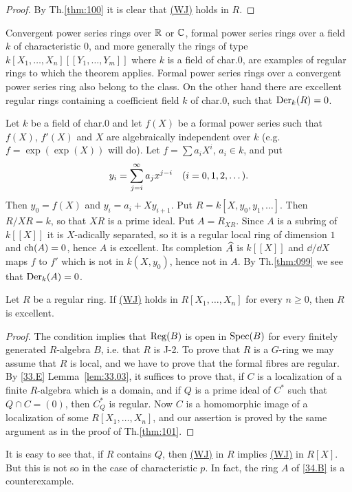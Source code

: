 \documentclass[../main]{subfiles}
\begin{document}
\begin{proof}
By Th.\ref{thm:100} it is clear that \hyperref[40.F]{(WJ)} holds in $R$. 
\end{proof}

\begin{remark*}
Convergent power series rings over $\mathbb{R}$ or $\mathbb{C}$, formal power series rings over a field $k$ of characteristic $0$, and more generally the rings of type \newline $k[X_1, \ldots, X_n][[Y_1, \ldots, Y_m]]$ where $k$ is a field of char.$0$, are examples of regular rings to which the theorem applies. Formal power series rings over a convergent power series ring also belong to the class. On the other hand there are excellent regular rings containing a coefficient field $k$ of char.$0$, such that $\operatorname{Der}_k(R) = 0$.
\end{remark*}

\begin{example}
Let $k$ be a field of char.$0$ and let $f(X)$ be a formal power series such that $f(X)$, $f'(X)$ and $X$ are algebraically independent over $k$ (e.g.\newline $f = \exp(\exp(X))$ will do). Let $f = \sum a_i X^i$, $a_i \in k$, and put \[y_i = \sum_{j = i}^\infty a_j x^{j - i}\for{i = 0, 1, 2, \ldots}.\] Then $y_0 = f(X)$ and $y_i = a_i + X y_{i + 1}$. Put $R = k[X, y_0, y_1, \ldots]$. Then $R/XR = k$, so that $XR$ is a prime ideal. Put $A = R_{XR}$. Since $A$ is a subring of $k[[X]]$ it is $X$-adically separated, so it is a regular local ring of dimension $1$ and $\operatorname{ch}(A) = 0$, hence $A$ is excellent. Its completion $\widehat{A}$ is $k[[X]]$ and $\dd/\dd X$ maps $f$ to $f'$ which is not in $k(X, y_0)$, hence not in $A$. By Th.\ref{thm:099} we see that $\operatorname{Der}_k(A) = 0$. 
\end{example}

\begin{theorem}\label{thm:103}
Let $R$ be a regular ring. If \hyperref[40.F]{(WJ)} holds in $R[X_1, \ldots, X_n]$ for every $n \ge 0$, then $R$ is excellent. 
\end{theorem}

\begin{proof}
The condition implies that $\operatorname{Reg}(B)$ is open in $\operatorname{Spec}(B)$ for every finitely generated $R$-algebra $B$, i.e. that $R$ is J-2. To prove that $R$ is a $G$-ring we may assume that $R$ is local, and we have to prove that the formal fibres are  regular. By \ref{33.E} Lemma~\ref{lem:33.03}, it suffices to prove that, if $C$ is a localization of a finite $R$-algebra which is a domain, and if $Q$ is a prime ideal of $C^\ast$ such that $Q \cap C = (0)$, then $C_Q^\ast$ is regular. Now $C$ is a homomorphic image of a localization of some $R[X_1, \ldots, X_n]$, and our assertion is proved by the same argument as in the proof of Th.\ref{thm:101}. 
\end{proof}

\begin{remark*}
It is easy to see that, if $R$ contains $Q$, then \hyperref[40.F]{(WJ)} in $R$ implies \hyperref[40.F]{(WJ)} in $R[X]$. But this is not so in the case of characteristic $p$. In fact, the ring $A$ of \ref{34.B} is a counterexample. 
\end{remark*}
\end{document}
